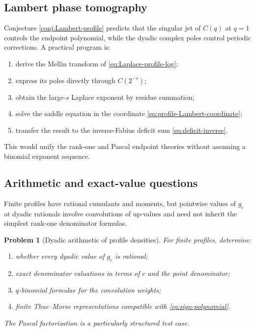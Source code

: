\documentclass[11pt]{article}
\numberwithin{equation}{section}
\newtheorem{problem}[theorem]{Problem}
\theoremstyle{definition}
\theoremstyle{remark}
\begin{document}
\subsection{Lambert phase tomography}

Conjecture \ref{conj:Lambert-profile} predicts that the singular jet of
$C(q)$ at $q=1$ controls the endpoint polynomial, while the dyadic complex
poles control periodic corrections.  A practical program is:
\begin{enumerate}[leftmargin=*]
\item derive the Mellin transform of \eqref{eq:Laplace-profile-log};
\item express its poles directly through $C(2^{-s})$;
\item obtain the large-$s$ Laplace exponent by residue summation;
\item solve the saddle equation in the coordinate
      \eqref{eq:profile-Lambert-coordinate};
\item transfer the result to the inverse-Fabius deficit sum
      \eqref{eq:deficit-inverse}.
\end{enumerate}
This would unify the rank-one and Pascal endpoint theories without assuming a
binomial exponent sequence.

\subsection{Arithmetic and exact-value questions}

Finite profiles have rational cumulants and moments, but pointwise values of
$g_c$ at dyadic rationals involve convolutions of up-values and need not inherit
the simplest rank-one denominator formulas.

\begin{problem}[Dyadic arithmetic of profile densities]
For finite profiles, determine:
\begin{enumerate}[label=\textup{(\roman*)},leftmargin=*]
\item whether every dyadic value of $g_c$ is rational;
\item exact denominator valuations in terms of $c$ and the point denominator;
\item $q$-binomial formulae for the convolution weights;
\item finite Thue--Morse representations compatible with
      \eqref{eq:sign-polynomial}.
\end{enumerate}
The Pascal factorization is a particularly structured test case.
\end{problem}
\end{document}
